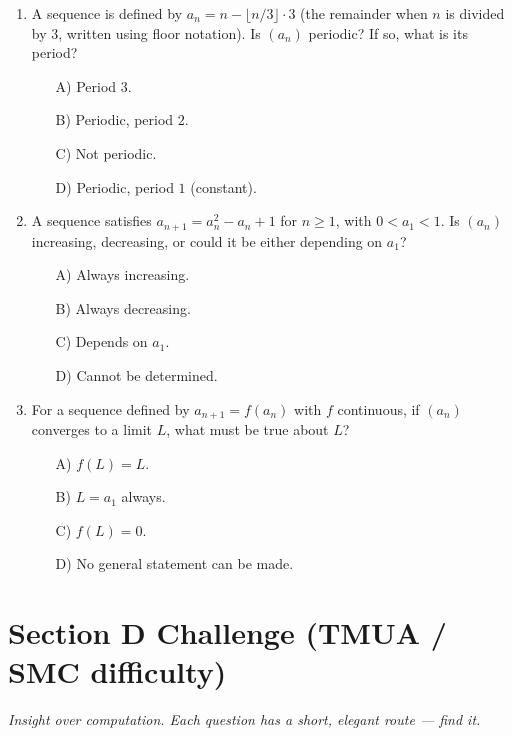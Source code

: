 \documentclass[11pt,a4paper]{article}
\begin{document}
\begin{enumerate}
\item A sequence is defined by $a_n=n-\lfloor n/3\rfloor\cdot3$ (the remainder when $n$ is divided by $3$, written using floor notation). Is $(a_n)$ periodic? If so, what is its period?
\begin{itemize}
\item[A)] Period $3$.
\item[B)] Periodic, period $2$.
\item[C)] Not periodic.
\item[D)] Periodic, period $1$ (constant).
\end{itemize}

\item A sequence satisfies $a_{n+1}=a_n^2-a_n+1$ for $n\geq1$, with $0<a_1<1$. Is $(a_n)$ increasing, decreasing, or could it be either depending on $a_1$?
\begin{itemize}
\item[A)] Always increasing.
\item[B)] Always decreasing.
\item[C)] Depends on $a_1$.
\item[D)] Cannot be determined.
\end{itemize}

\item For a sequence defined by $a_{n+1}=f(a_n)$ with $f$ continuous, if $(a_n)$ converges to a limit $L$, what must be true about $L$?
\begin{itemize}
\item[A)] $f(L)=L$.
\item[B)] $L=a_1$ always.
\item[C)] $f(L)=0$.
\item[D)] No general statement can be made.
\end{itemize}

\end{enumerate}

\section*{Section D \quad Challenge \hfill{\normalfont\small(TMUA / SMC difficulty)}}

\noindent\textit{Insight over computation. Each question has a short, elegant route --- find it.}
\end{document}
